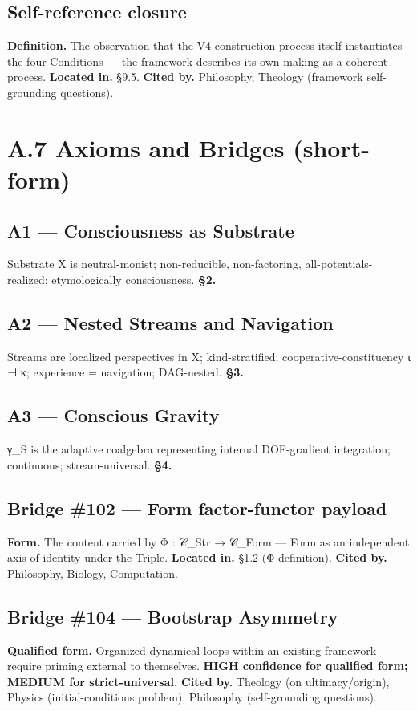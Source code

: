 \documentclass[11pt, openany]{book}
\newcommand{\sectionbreak}{\clearpage}
\begin{document}
\subsection{Self-reference closure}
\textbf{Definition.} The observation that the V4 construction process itself instantiates the four Conditions --- the framework describes its own making as a coherent process.
\textbf{Located in.} §9.5.
\textbf{Cited by.} Philosophy, Theology (framework self-grounding questions).

\sectionbreak

\section{A.7 Axioms and Bridges (short-form)}

\subsection{A1 --- Consciousness as Substrate}
Substrate X is neutral-monist; non-reducible, non-factoring, all-potentials-realized; etymologically consciousness.
\textbf{§2.}

\subsection{A2 --- Nested Streams and Navigation}
Streams are localized perspectives in X; kind-stratified; cooperative-constituency ι ⊣ κ; experience = navigation; DAG-nested.
\textbf{§3.}

\subsection{A3 --- Conscious Gravity}
γ\_\allowbreak{}S is the adaptive coalgebra representing internal DOF-gradient integration; continuous; stream-universal.
\textbf{§4.}

\subsection{Bridge \#102 --- Form factor-functor payload}
\textbf{Form.} The content carried by Φ : 𝒞\_\allowbreak{}Str → 𝒞\_\allowbreak{}Form --- Form as an independent axis of identity under the Triple.
\textbf{Located in.} §1.2 (Φ definition).
\textbf{Cited by.} Philosophy, Biology, Computation.

\subsection{Bridge \#104 --- Bootstrap Asymmetry}
\textbf{Qualified form.} Organized dynamical loops within an existing framework require priming external to themselves.
\textbf{HIGH confidence for qualified form; MEDIUM for strict-universal.}
\textbf{Cited by.} Theology (on ultimacy/origin), Physics (initial-conditions problem), Philosophy (self-grounding questions).
\end{document}
